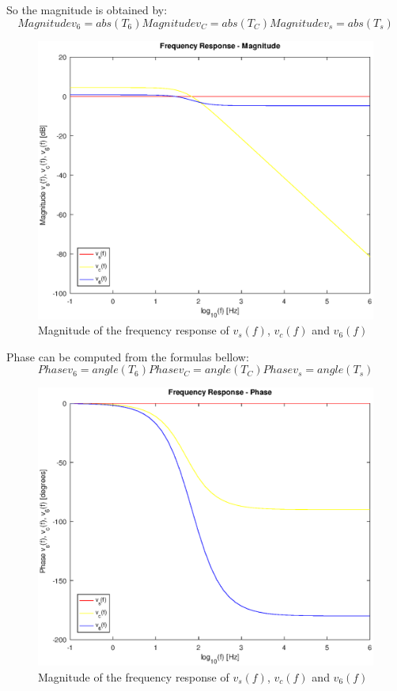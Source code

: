 So the magnitude is obtained by:
\begin{equation}
  Magnitude v_{6} = abs(T_{6})
  Magnitude v_{C} = abs(T_{C}) 
  Magnitude v_{s} = abs(T_{s})  
\end{equation}

\begin{figure}[H] \centering
\includegraphics[width=0.8\linewidth]{freq_db.eps}
\caption{Magnitude of the frequency response of $v_s(f)$, $v_c(f)$ and $v_6(f)$}
\label{fig:magnitude_theo}
\end{figure}

Phase can be computed from the formulas bellow:
\begin{equation}
  Phase v_{6} = angle(T_{6})
  Phase v_{C} = angle(T_{C})
  Phase v_{s} = angle(T_{s})
\end{equation}

\begin{figure}[H] \centering
\includegraphics[width=0.8\linewidth]{phase_ang.eps}
\caption{Magnitude of the frequency response of $v_s(f)$, $v_c(f)$ and $v_6(f)$}
\label{fig:phase_theo}
\end{figure}

